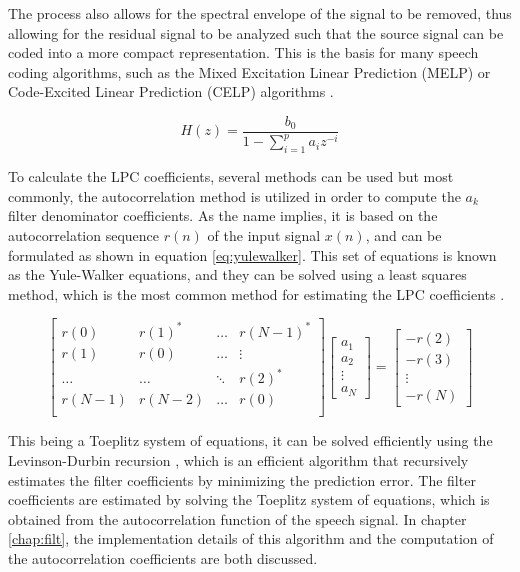 The process also allows for the spectral envelope of the signal to be removed, thus allowing for the residual signal to be analyzed such that the source signal can be coded into a more compact representation. This is the basis for many speech coding algorithms, such as the Mixed Excitation Linear Prediction (MELP) or Code-Excited Linear Prediction (CELP) algorithms \cite{LinearPredictionCoding2003}.

\begin{equation}
    H(z) = \frac{b_0}{1 - \sum_{i=1}^{p} a_i z^{-i}}
    \label{eq:lpcFilter}
\end{equation}

To calculate the LPC coefficients, several methods can be used but most commonly, the autocorrelation method is utilized in order to compute the $a_k$ filter denominator coefficients. As the name implies, it is based on the autocorrelation sequence $r(n)$ of the input signal $x(n)$, and can be formulated as shown in equation \ref{eq:yulewalker}. This set of equations is known as the Yule-Walker equations, and they can be solved using a least squares method, which is the most common method for estimating the LPC coefficients \cite{jackson1996digital}.

\begin{equation}
    \begin{bmatrix}
        r(0) & r(1)^* & \dots & r(N-1)^* \\
        r(1) & r(0) & \dots & \vdots \\
        \dots & \dots & \ddots & r(2)^* \\
        r(N-1) & r(N-2) & \dots & r(0) \\
    \end{bmatrix}
    \begin{bmatrix}
        a_1 \\
        a_2 \\
        \vdots \\
        a_N
    \end{bmatrix}
    =
    \begin{bmatrix}
        -r(2) \\
        -r(3) \\
        \vdots \\
        -r(N)
    \end{bmatrix}
    \label{eq:yulewalker}
\end{equation}

This being a Toeplitz system of equations, it can be solved efficiently using the Levinson-Durbin recursion \cite{hayes1996statistical}, which is an efficient algorithm that recursively estimates the filter coefficients by minimizing the prediction error. The filter coefficients are estimated by solving the Toeplitz system of equations, which is obtained from the autocorrelation function of the speech signal. In chapter \ref{chap:filt}, the implementation details of this algorithm and the computation of the autocorrelation coefficients are both discussed.



